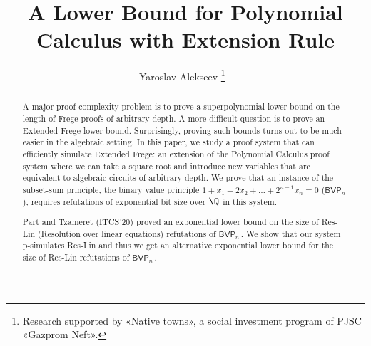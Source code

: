 \documentclass{toc}
\begin{document}
\begin{frontmatter} %
  
%
\title{A Lower Bound for Polynomial Calculus with Extension Rule } %
%
%

%
%
%

%
%
%
%
%
%
%
%
%
%
%
%


%
%
%
%

%

\author[alex]{Yaroslav Alekseev%
%
\thanks{Research supported  %
by «Native towns», a  %
social investment program of PJSC «Gazprom Neft».}
%
\,\,}

%
%
%
%

%
%
%
%
%
%
\begin{abstract}
  A major proof complexity problem is to prove a %
  superpolynomial 
  lower bound on the length of Frege proofs of arbitrary depth. A more difficult question is to prove an Extended Frege lower bound. Surprisingly, proving such bounds turns out to be much easier in the algebraic setting. In this paper, we study a proof system that can
efficiently %
simulate Extended Frege: an extension of the Polynomial Calculus proof system where we can take a square root and introduce new variables that are equivalent to
%
algebraic circuits of arbitrary depth.  %
%
%
%
We prove that an instance of the subset-sum principle, the binary value principle  $1 + x_1 + 2 x_2 + \ldots + 2^{n - 1} x_n = 0$ ($\mathsf{BVP}_n$), requires refutations of exponential bit size over $\Q$ in this system. 

Part and Tzameret (ITCS'20) proved an exponential lower bound on the size of Res-Lin (Resolution over linear equations) refutations of %
$\mathsf{BVP}_n\,.$ %
 We show that our system p-simulates Res-Lin and thus we get an alternative exponential lower bound for the size of Res-Lin refutations of %
$\mathsf{BVP}_n\,.$ %

\end{abstract}

%

\end{frontmatter}

%
%
%
\end{document}
